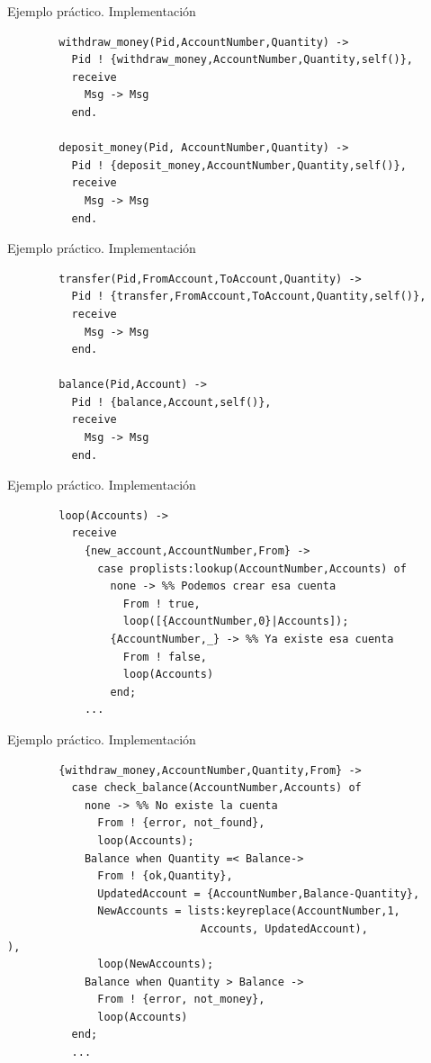 \documentclass{beamer}
\begin{document}
    \begin{frame}[fragile]{Ejemplo práctico. Implementación}
      \begin{verbatim}
        withdraw_money(Pid,AccountNumber,Quantity) ->
          Pid ! {withdraw_money,AccountNumber,Quantity,self()},
          receive
            Msg -> Msg
          end.

        deposit_money(Pid, AccountNumber,Quantity) ->
          Pid ! {deposit_money,AccountNumber,Quantity,self()},
          receive
            Msg -> Msg
          end.
      \end{verbatim}
    \end{frame}

    \begin{frame}[fragile]{Ejemplo práctico. Implementación}
      \begin{verbatim}
        transfer(Pid,FromAccount,ToAccount,Quantity) ->
          Pid ! {transfer,FromAccount,ToAccount,Quantity,self()},
          receive
            Msg -> Msg
          end.

        balance(Pid,Account) ->
          Pid ! {balance,Account,self()},
          receive
            Msg -> Msg
          end.
      \end{verbatim}
    \end{frame}

    \begin{frame}[fragile]{Ejemplo práctico. Implementación}
      \begin{verbatim}
        loop(Accounts) ->
          receive
            {new_account,AccountNumber,From} ->
              case proplists:lookup(AccountNumber,Accounts) of
                none -> %% Podemos crear esa cuenta
                  From ! true,
                  loop([{AccountNumber,0}|Accounts]);
                {AccountNumber,_} -> %% Ya existe esa cuenta
                  From ! false,
                  loop(Accounts)
                end;
            ...
      \end{verbatim}
    \end{frame}

    \begin{frame}[fragile]{Ejemplo práctico. Implementación}
      \begin{verbatim}
        {withdraw_money,AccountNumber,Quantity,From} ->
          case check_balance(AccountNumber,Accounts) of
            none -> %% No existe la cuenta
              From ! {error, not_found},
              loop(Accounts);
            Balance when Quantity =< Balance->
              From ! {ok,Quantity},
              UpdatedAccount = {AccountNumber,Balance-Quantity},
              NewAccounts = lists:keyreplace(AccountNumber,1,
                              Accounts, UpdatedAccount),                             ),
              loop(NewAccounts);
            Balance when Quantity > Balance ->
              From ! {error, not_money},
              loop(Accounts)
          end;
          ...
      \end{verbatim}
    \end{frame}
\end{document}
